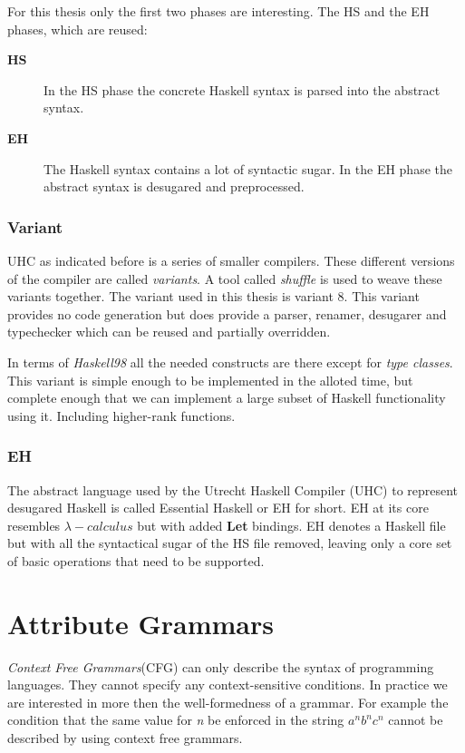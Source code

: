 \documentclass[twoside, titlepage, openright, a4paper]{book}
\begin{document}
For this thesis only the first two phases are interesting. The HS and the EH phases, which are reused:
\begin{description}
\item[\textbf{HS}] In the HS phase the concrete Haskell syntax is parsed into the abstract syntax. 
\item[\textbf{EH}] The Haskell syntax contains a lot of syntactic sugar. In the EH phase the abstract syntax is desugared and preprocessed.
\end{description}
\subsection{Variant}
UHC as indicated before is a series of smaller compilers. These different versions of the compiler are called \emph{variants}. A tool called \emph{shuffle} is used to weave these variants together. The variant used in this thesis is variant 8. This variant provides no code generation but does provide a parser, renamer, desugarer and typechecker which can be reused and partially overridden.

In terms of \emph{Haskell98} all the needed constructs are there except for \emph{type classes}. This variant is simple enough to be implemented in the alloted time, but complete enough that we can implement a large subset of Haskell functionality using it. Including higher-rank functions.

\subsection{EH}
The abstract language used by the Utrecht Haskell Compiler (UHC) to represent desugared Haskell is called Essential Haskell or EH for short. EH at its core resembles $\lambda-calculus$ but with added \textbf{Let} bindings. EH denotes a Haskell file but with all the syntactical sugar of the HS file removed, leaving only a core set of basic operations that need to be supported.

\chapter{Attribute Grammars}
\label{AG}
\emph{Context Free Grammars}(CFG) can only describe the syntax of programming languages\cite{knuth1}. They cannot specify any context-sensitive conditions. In practice we are interested in more then the well-formedness of a grammar. For example the condition that the same value for \emph{n} be enforced in the string $a^nb^nc^n$ cannot be described by using context free grammars\cite{ken}.
\end{document}
